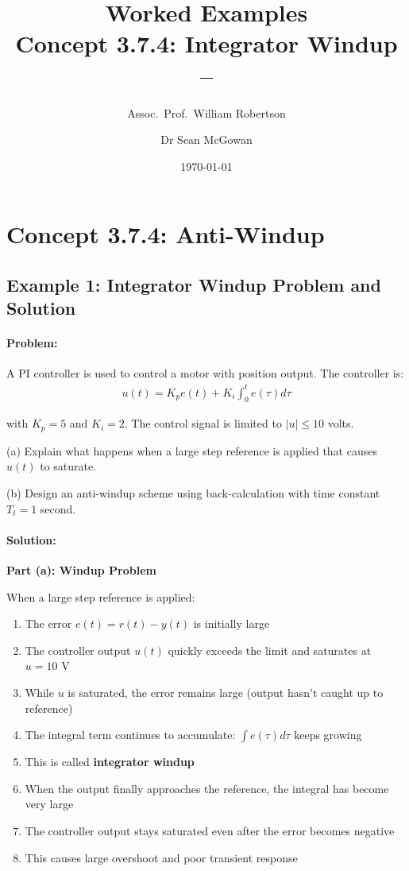 \documentclass[11pt,a4paper]{article}
\title{\textbf{Worked Examples}\\[0.5em]
\large Concept 3.7.4: Integrator Windup\\[0.3em]
\normalsize \coursesubtitle{} -- \coursetitle}
\author{Assoc.\ Prof.\ William Robertson \and Dr Sean McGowan}
\date{\today}
\begin{document}
\maketitle
\tableofcontents
\newpage

\section{Concept 3.7.4: Anti-Windup}

\subsection{Example 1: Integrator Windup Problem and Solution}

\paragraph{Problem:} A PI controller is used to control a motor with position output. The controller is:
\begin{align}
  u(t) = K_p e(t) + K_i \int_0^t e(\tau) d\tau
\end{align}

with $K_p = 5$ and $K_i = 2$. The control signal is limited to $|u| \leq 10$ volts.

(a) Explain what happens when a large step reference is applied that causes $u(t)$ to saturate.

(b) Design an anti-windup scheme using back-calculation with time constant $T_t = 1$ second.

\paragraph{Solution:}

\textbf{Part (a): Windup Problem}

When a large step reference is applied:

\begin{enumerate}
  \item The error $e(t) = r(t) - y(t)$ is initially large
  \item The controller output $u(t)$ quickly exceeds the limit and saturates at $u = 10$ V
  \item While $u$ is saturated, the error remains large (output hasn't caught up to reference)
  \item The integral term continues to accumulate: $\int e(\tau) d\tau$ keeps growing
  \item This is called \textbf{integrator windup}
  \item When the output finally approaches the reference, the integral has become very large
  \item The controller output stays saturated even after the error becomes negative
  \item This causes large overshoot and poor transient response
\end{enumerate}
\end{document}
